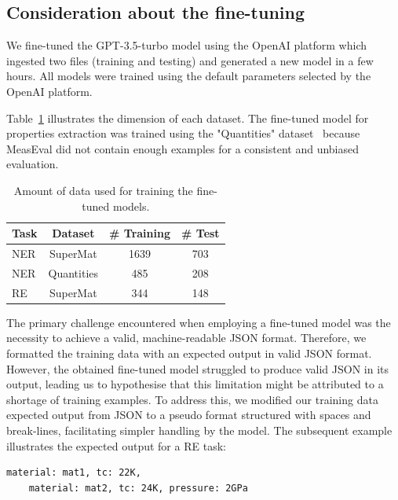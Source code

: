 \documentclass[a4paper]{article}
\begin{document}
\subsection{Consideration about the fine-tuning}

We fine-tuned the GPT-3.5-turbo model using the OpenAI platform which ingested two files (training and testing) and generated a new model in a few hours. 
All models were trained using the default parameters selected by the OpenAI platform.

Table~\ref{tab:amount-data-fine-tuned} illustrates the dimension of each dataset. 
The fine-tuned model for properties extraction was trained using the "Quantities" dataset~\cite{foppiano2019quantities} because MeasEval did not contain enough examples for a consistent and unbiased evaluation. 

\begin{table}[htbp]
    \centering
    \label{tab:amount-data-fine-tuned}
    \caption{Amount of data used for training the fine-tuned models.}
    \begin{tabular}{lccc}
        Task & Dataset & \# Training & \# Test \\
        \toprule
        NER & SuperMat   & 1639 & 703 \\
        NER & Quantities & 485 & 208 \\
        RE  & SuperMat   & 344 & 148 \\
        \bottomrule
    \end{tabular}
\end{table}

The primary challenge encountered when employing a fine-tuned model was the necessity to achieve a valid, machine-readable JSON format. 
Therefore, we formatted the training data with an expected output in valid JSON format. 
However, the obtained fine-tuned model struggled to produce valid JSON in its output, leading us to hypothesise that this limitation might be attributed to a shortage of training examples. 
To address this, we modified our training data expected output from JSON to a pseudo format structured with spaces and break-lines, facilitating simpler handling by the model. The subsequent example illustrates the expected output for a RE task:

\begin{lstlisting}[caption=Example format of the expected answer for the RE task]
    material: mat1, tc: 22K, 
    material: mat2, tc: 24K, pressure: 2GPa
\end{lstlisting}
\end{document}
